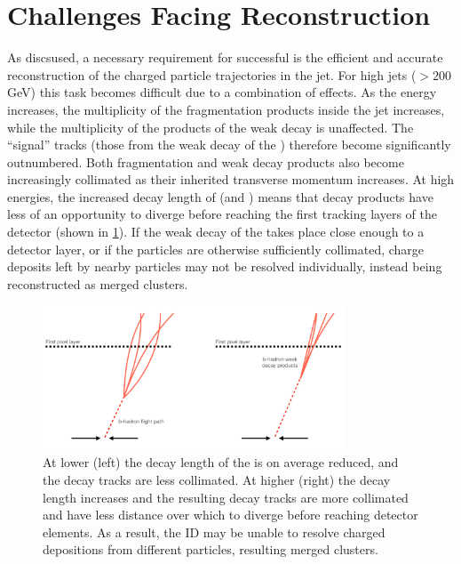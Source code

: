 \section{Challenges Facing \bhadron Reconstruction}\label{sec:b_track_reco_challenges}

As discsused, a necessary requirement for successful \btagging is the efficient and accurate reconstruction of the charged particle trajectories in the jet.
For high \pT jets (\pT $> 200$ GeV) this task becomes difficult due to a combination of effects.
As the \bjet energy increases, the multiplicity of the fragmentation products inside the jet increases, while the multiplicity of the products of the weak decay is unaffected.
The ``signal'' tracks (those from the weak decay of the \bhadron) therefore become significantly outnumbered.
Both fragmentation and \bhadron weak decay products also become increasingly collimated as their inherited transverse momentum increases.
At high energies, the increased decay length of \bhadrons (and \chadrons) means that decay products have less of an opportunity to diverge before reaching the first tracking layers of the detector (shown in \cref{fig:high_pt_b_decay}).
If the weak decay of the \bhadron takes place close enough to a detector layer, or if the particles are otherwise sufficiently collimated, charge deposits left by nearby particles may not be resolved individually, instead being reconstructed as merged clusters.

\begin{figure}[!htbp]
  \centering
  \includegraphics[width=0.8\textwidth]{chapters/3.tracking/figs/high_pt_b_decay.pdf}
  \caption{
    At lower \pt (left) the decay length of the \bhadron is on average reduced, and the decay tracks are less collimated.
    At higher \pt (right) the \bhadron decay length increases and the resulting decay tracks are more collimated and have less distance over which to diverge before reaching detector elements.
    As a result, the ID may be unable to resolve charged depositions from different particles, resulting merged clusters.
  }
  \label{fig:high_pt_b_decay}
\end{figure}

